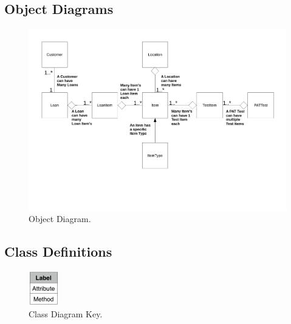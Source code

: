 \begin{landscape}

\subsection{Object Diagrams}

\begin{figure}[H]
    \begin{center}
    \includegraphics[width=500px]{./Design/Object_Diagrams/Object_diagrams.pdf}
    \caption{Object Diagram.} \label{fig:object_diagram}
    \end{center}
\end{figure}

\newpage

\subsection{Class Definitions}

\begin{figure}[H]
    \centerline{\includegraphics[width=50px]{./Design/Class_Definitions/Class_definition_key.pdf}}
    \caption{Class Diagram Key.} \label{fig:relationship_diagram}
\end{figure}


\end{landscape}
